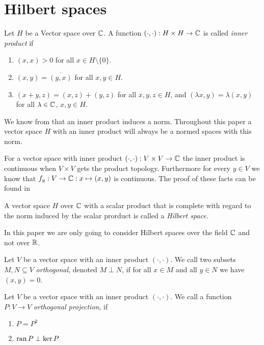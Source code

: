 \section{Hilbert spaces}

\begin{definition}
	Let $H$ be a Vector space over $\mathbb{C}$. A function $(\cdot, \cdot): H \times H \to \mathbb{C}$ is called \textit{inner product} if 
	\begin{enumerate}
		\item $(x,x) > 0$ for all $x \in H \setminus \{0\}$.
		\item $(x,y) = \overline{(y,x)}$ for all $x,y \in H$.
		\item $(x + y, z) = (x,z) + (y,z)$ for all $x,y,z \in H$, and $(\lambda x, y) = \lambda (x,y)$ for all $\lambda \in \mathbb{C}$, $x,y \in H$. 
	\end{enumerate}
\end{definition}

\begin{remark}
	We know from \cite[p.41]{FAna1} that an inner product induces a norm. Throughout this paper a vector space $H$ with an inner product will always be a normed spaces with this norm.
\end{remark}

\begin{remark}
	For a vector space with inner product $(\cdot, \cdot): V \times V \to \mathbb{C}$ the inner product is continuous when $V \times V$ gets the product topology. Furthermore for every $y \in V$ we know that $f_y:V \to \mathbb{C}: x \mapsto (x,y)$ is continuous. The proof of these facts can be found in \cite[p.43]{FAna1} 
\end{remark}

\begin{definition}
	A vector space $H$ over $\mathbb{C}$ with a scalar product that is complete with regard to the norm induced by the scalar prorduct is called a \textit{Hilbert space}.
\end{definition}

In this paper we are only going to consider Hilbert spaces over the field $\mathbb{C}$ and not over $\mathbb{R}$. 

\begin{definition}
	Let $V$ be a vector space with an inner product $(\cdot, \cdot)$. We call two subsets $M,N \subseteq V$ \textit{orthogonal}, denoted $M \perp N$, if for all $x \in M$ and all $y \in N$ we have $(x,y) = 0$.  
\end{definition}

\begin{definition}
	Let $V$ be a vector space with an inner product $(\cdot, \cdot)$. We call a function $P: V \to V$ \textit{orthogonal projection}, if
	\begin{enumerate}
		\item $P = P^2$
		\item $\operatorname{ran} P \perp \ker P$
	\end{enumerate}
\end{definition}


